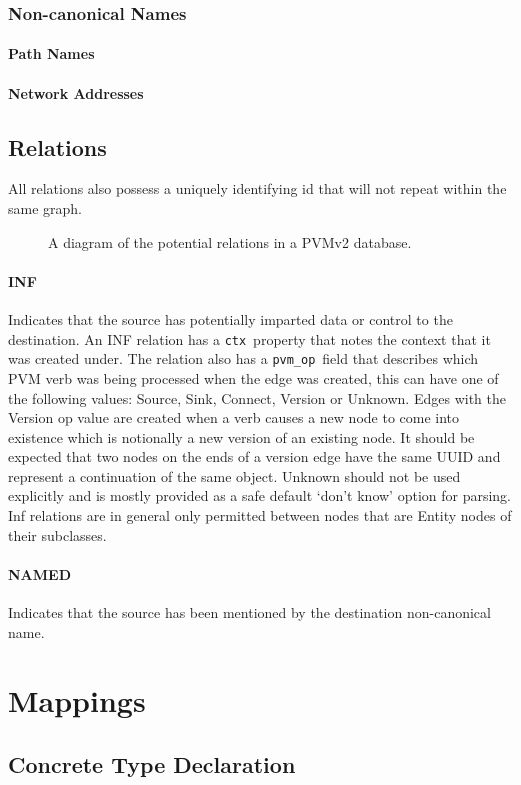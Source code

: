 \documentclass[12pt,twoside,a4paper]{article}
\newcommand{\field}[1]{\texttt{#1}}
\newcommand{\para}[1]{\paragraph{#1\\}}
\begin{document}
\subsubsection{Non-canonical Names}
\label{sec:gs:node:name}

\para{Path Names}
\label{sec:gs:node:name:path}

\para{Network Addresses}
\label{sec:gs:node:name:net}

\subsection{Relations}
\label{sec:gs:rel}
All relations also possess a uniquely identifying id that will not repeat within the same graph.

\begin{figure}[h]
\centering

\caption{A diagram of the potential relations in a PVMv2 database.}
\label{fig:rels}
\end{figure}

\para{INF}
\label{sec:gs:rel:inf}
Indicates that the source has potentially imparted data or control to the destination. An INF relation has a \field{ctx}~property that notes the context that it was created under. The relation also has a \field{pvm\_op}~field that describes which PVM verb was being processed when the edge was created, this can have one of the following values: Source, Sink, Connect, Version or Unknown. Edges with the Version op value are created when a verb causes a new node to come into existence which is notionally a new version of an existing node. It should be expected that two nodes on the ends of a version edge have the same UUID and represent a continuation of the same object. Unknown should not be used explicitly and is mostly provided as a safe default `don't know' option for parsing. Inf relations are in general only permitted between nodes that are Entity nodes of their subclasses.

\para{NAMED}
\label{sec:gs:rel:named}
Indicates that the source has been mentioned by the destination non-canonical name.

\section{Mappings}
\label{sec:map}

\subsection{Concrete Type Declaration}
\label{sec:map:tydef}
\end{document}
